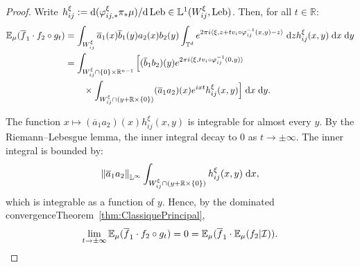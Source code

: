 \documentclass[10pt]{amsart}
\theoremstyle{definition}\newtheorem{defi}[theo]{Definition}\newtheorem{rema}[theo]{Remark}\newtheorem{exam}[theo]{Example}\newtheorem{exem}[theo]{Example}\newtheorem{nota}[theo]{Notation}
\DeclareMathOperator{\Leb}{Leb}
\newcommand{\R}{\mathbb{R}}
\newcommand{\Ebb}{\mathbb{E}}
\newcommand{\Lbb}{\mathbb{L}}
\newcommand{\Tbb}{\mathbb{T}}
\newcommand{\Ical}{\mathcal{I}}
\newcommand{\dd}{\;{\rm d}}
\newcommand{\de}{{\rm d}}
\newcommand{\norm}[2]{\left\| #1 \right\|_{#2}}
\begin{document}
\begin{proof}

Write $h_{ij}^\xi := \de (\varphi_{ij,*}^\xi \pi_* \mu) / \de \Leb \in \Lbb^1 (W_{ij}^\xi, \Leb)$. Then, for all $t \in \R$:
\begin{align*}
\Ebb_\mu (\overline{f}_1 \cdot f_2 \circ g_t) & = \int_{W_{ij}^\xi} \overline{a}_1(x) \overline{b}_1(y) a_2(x) b_2(y) \int_{\Tbb^d} e^{2\pi i \langle \xi, z+tv_i \circ \varphi_{ij}^{-1}(x,y)-z \rangle} \dd z h_{ij}^\xi (x,y) \dd x \dd y \\
& = \int_{W_{ij}^\xi \cap \{0\} \times \R^{n-1}} \Big[(\overline{b}_1 b_2) (y) e^{2\pi i \langle \xi, tv_i \circ \varphi_{ij}^{-1}(0,y) \rangle} \\
& \hspace{2em} \times \int_{W_{ij}^\xi \cap (y+\R\times\{0\})} (\overline{a}_1 a_2)(x) e^{ixt} h_{ij}^\xi (x,y) \Big] \dd x \dd y.
\end{align*}

The function $x \mapsto (\overline{a}_1 a_2)(x) h_{ij}^\xi (x,y)$ is integrable for almost every $y$. By the Riemann--Lebesgue lemma, the inner integral decay to $0$ as $t \to \pm \infty$. The inner integral is bounded by:
\[
\norm{\overline{a}_1 a_2}{\Lbb^\infty} \int_{W_{ij}^\xi \cap (y+\R\times\{0\})} h_{ij}^\xi (x,y) \dd x,
\]
which is integrable as a function of $y$. Hence, by the dominated convergence\linebreak Theorem~\ref{thm:ClassiquePrincipal},
\[
\lim_{t \to \pm \infty} \Ebb_\mu (\overline{f}_1 \cdot f_2 \circ g_t) = 0 = \Ebb_\mu (\overline{f}_1 \cdot \Ebb_\mu (f_2| \Ical)). \qedhere
\]
\end{proof}
\end{document}
